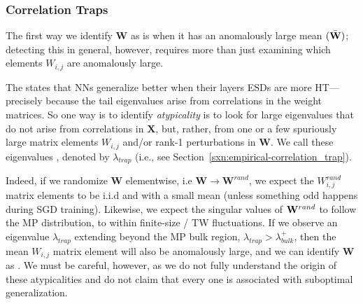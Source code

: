 \subsubsection{Correlation Traps}
\label{sxn:Traps}

The first way we identify $\mathbf{W}$ as \ATypical is when it has an anomalously large mean $(\bar{{\mathbf{W}}})$;
detecting this in general, however, requires more than just examining which elements $W_{i,j}$ are
anomalously large.

The \HTSR \Phenomenology states that NNs generalize better when their layers ESDs are more HT---precisely because the 
tail eigenvalues arise from correlations in the weight matrices.
So one way is to identify \emph{atypicality} is to look for  large eigenvalues that
do not arise from correlations in $\mathbf{X}$,
but, rather, from one or a few spuriously large matrix elements $W_{i,j}$ and/or rank-1 perturbations in $\mathbf{W}$.
We call these eigenvalues  \CorrelationTraps, denoted by $\lambda_{trap}$
(i.e., see Section~\ref{sxn:empirical-correlation_trap}).

Indeed, if we randomize $\mathbf{W}$ elementwise, i.e $\mathbf{W}\rightarrow\mathbf{W}^{rand}$, we
expect the $W^{rand}_{i,j}$ matrix elements to be i.i.d and with a small mean
(unless something odd happens during SGD training).
Likewise, we expect the singular values of ${\mathbf{W}}^{rand}$ to follow the MP distribution, to within
finite-size / TW fluctuations.
If we observe an eigenvalue $\lambda_{trap}$ extending beyond the MP bulk region, $\lambda_{trap}>\lambda^{+}_{bulk}$,
then the mean $W_{i,j}$ matrix element will also be anomalously large,
and we can identify $\mathbf{W}$ as \ATypical.
We must be careful, however, as we do not fully understand the origin of these atypicalities
and do not claim that every one is associated with suboptimal generalization.



